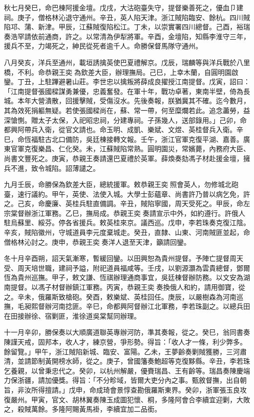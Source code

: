 \begin{pinyinscope}
秋七月癸巳，命巴棟阿援金壇。戊戌，大沽砲臺失守，提督樂善死之，優血⼙建祠。庚子，僧格林沁退守通州。辛丑，英人陷天津。浙江賊陷臨安、餘杭。四川賊陷邛、蒲、新津。甲辰，江蘇賊復陷松江。丁未，以崇實署四川總督。己酉，裕瑞奏浩罕請依前通商，許之。以常清為伊犁將軍。辛酉，金壇陷，知縣李淮守三年，援兵不至，力竭死之，紳民從死者逾千人。命勝保督馬隊守通州。

八月癸亥，洋兵至通州，載垣誘擒英使巴夏禮解京。戊辰，瑞麟等與洋兵戰於八里橋，不利。命恭親王奕為欽差大臣，辦理撫局。己巳，上幸木蘭，自圓明園啟鑾。丁丑，上駐蹕避暑山莊。李世忠以擒叛將薛成良擢授江南提督。戊寅，詔曰：「江南提督張國樑謀勇兼優，忠義奮發。在軍十年，戰功卓著，東南半壁，倚為長城。本年大營潰散，回援擊賊，受傷沒水。先後奏報，朕猶冀其不確。迄今數月，其為效死捐軀無疑。若使張國樑尚在，蘇、常一帶，何至糜爛若此。追念藎勞，益深愴惻。贈太子太保，入祀昭忠祠，分建專祠。子孫幾人，送部錄用。」己卯，命都興阿帶兵入衛，從官文請也。命玉明、成凱、樂斌、文煜、英桂督兵入衛。辛巳，命恆福駐古北口備防，吳廷棟接轉文報。壬午，浙江官軍克復平湖、嘉善。廣東官軍克復樂昌、仁化癸。未，江蘇賊陷常熟。圓明園災，常嬪薨，內務府大臣、尚書文豐死之。庚寅，恭親王奏請還巴夏禮於英軍。薛煥奏劾馮子材赴援金壇，擁兵不進，致令城陷。詔薄譴之。

九月壬辰，命勝保為欽差大臣，總統援軍。敕恭親王奕照會英人，勿修城北砲臺，速行議約。甲午，英使、法使入城。大學士彭蘊章、尚書許乃普以病乞免，許之。己亥，命慶廉、英桂兵駐直備調。辛丑，賊陷寧國，周天受死之。甲辰，命左宗棠督辦浙江軍務。乙巳，撫局成。恭親王奕奏請宣示中外，如約遵行。許俄人駐烏蘇里、綏芬。停各省援兵。敕英桂來京。議西巡。戊申，李若珠奏克復江陰。辛亥，賊陷徽州，守城道員李元度棄城走。癸丑，直隸、山東、河南賊匪並起，命僧格林沁討之。庚申，恭親王奕奏洋人退至天津，籲請回鑾。

冬十月辛酉朔，詔天氣漸寒，暫緩回鑾。以田興恕為貴州提督。予陣亡提督周天受、周天培世職，建祠予謚，附祀道員福咸等。壬戌，以劉源灝為雲貴總督，鄧爾恆為貴州巡撫。甲子，敕文謙、恆祺辦理通商事宜，吳廷棟督辦防務。以文安為湖南提督。以馮子材督辦鎮江軍務。丙寅，恭親王奕奏換俄人和約，請用御寶，從之。辛未，俄羅斯致槍砲。癸酉，敕樂斌、英桂回任。庚辰，以嚴樹森為河南巡撫，毛昶熙督辦河南捻匪。辛巳，命都興阿督辦江北軍務，李若珠副之。以總兵田在田接辦徐、宿剿匪，淮徐道吳棠幫同辦理。

十一月辛卯，勝保奏以大順廣道聯英專辦河防，準其奏報，從之。癸巳，翁同書奏陳謹天戒，固邦本，收人才，練京營，爭形勢。得旨：「收人才一條，利少弊多。餘留覽。」甲午，浙江賊陷新城、臨安、富陽。乙未，王夢齡奏剿賊獲勝，三河肅清，並請節制黃開榜水師，從之。庚子，曾國籓奏鮑超等克復黟縣。辛丑，李若珠乞養親，以曾秉忠代之。癸卯，以杭州解嚴，優賚瑞昌、王有齡等。瑞昌奏陳慶端力保浙疆，請加優獎。得旨：「不分畛域，皆爾大吏分內之事。甄敘督撫，出自朝旨，非汝所得擅請。」戊申，命成琦會景惇查勘俄羅斯東界。癸卯，浙軍張玉良攻復嚴州。甲寅，官文、胡林翼奏陳玉成圖犯懷、桐，多隆阿會合李續宜迎剿，大敗之，殺賊萬餘。多隆阿賜黃馬褂，李續宜加二品銜。


\end{pinyinscope}
